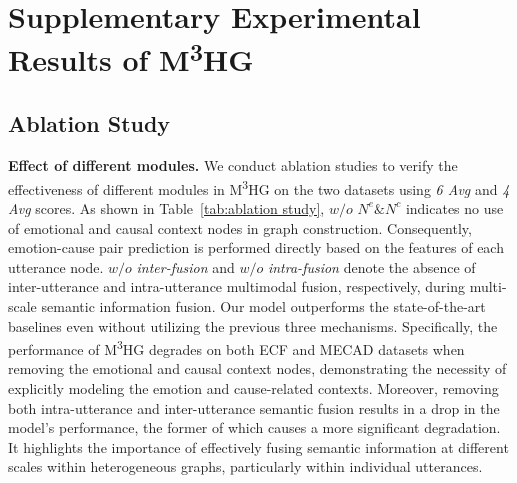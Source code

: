 \documentclass[11pt]{article}
\begin{document}
\section{\texorpdfstring{Supplementary Experimental Results of M\textsuperscript{3}HG}{Supplementary Experimental Results of M3HG}}
\label{more experimental results}
\subsection{Ablation Study}
\label{ablation study}
\textbf{Effect of different modules.} We conduct ablation studies to verify the effectiveness of different modules in M\textsuperscript{3}HG on the two datasets using \textit{6 Avg} and \textit{4 Avg} scores.
As shown in Table~\ref{tab:ablation study}, $w/o$ $N^e \& N^c$ indicates no use of emotional and causal context nodes in graph construction.
Consequently, emotion-cause pair prediction is performed directly based on the features of each utterance node.
$w/o$ \textit{inter-fusion} and $w/o$ \textit{intra-fusion} denote the absence of inter-utterance and intra-utterance multimodal fusion, respectively, during multi-scale semantic information fusion.
Our model outperforms the state-of-the-art baselines even without utilizing the previous three mechanisms.
Specifically, the performance of M\textsuperscript{3}HG degrades on both ECF and MECAD datasets when removing the emotional and causal context nodes, demonstrating the necessity of explicitly modeling the emotion and cause-related contexts.
Moreover, removing both intra-utterance and inter-utterance semantic fusion results in a drop in the model's performance, the former of which causes a more significant degradation.
It highlights the importance of effectively fusing semantic information at different scales within heterogeneous graphs, particularly within individual utterances.
\end{document}
